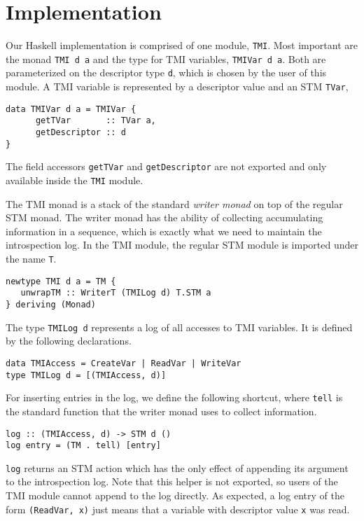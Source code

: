\section{Implementation}
\label{sec:implementation}

Our Haskell implementation is comprised of one module, \verb+TMI+. Most important are the
monad \lstinline+TMI d a+ and the type for TMI variables, \lstinline+TMIVar d a+. 
Both are parameterized on the descriptor type \lstinline+d+, which is chosen by the user
of this module. A TMI variable is represented by a descriptor value and an STM \lstinline+TVar+,
\begin{lstlisting}[style=small]
data TMIVar d a = TMIVar {
      getTVar       :: TVar a,
      getDescriptor :: d
}
\end{lstlisting}
The field accessors \lstinline+getTVar+ and \lstinline+getDescriptor+ are not exported and
only available inside the \lstinline+TMI+ module.

The TMI monad is a stack of the standard {\em writer monad} on top of the regular STM
monad. The writer monad has the ability of collecting accumulating information in a
sequence, which is exactly what we need to maintain the introspection log.
In the TMI module, the regular STM module is imported under the name \lstinline+T+.
\begin{lstlisting}[style=small]
newtype TMI d a = TM {
   unwrapTM :: WriterT (TMILog d) T.STM a
} deriving (Monad)
\end{lstlisting}
The type \lstinline+TMILog d+ represents a log of all accesses to TMI variables.
It is defined by the following declarations.
\begin{lstlisting}[style=small]
data TMIAccess = CreateVar | ReadVar | WriteVar
type TMILog d = [(TMIAccess, d)]
\end{lstlisting}
For inserting entries in the log, we define the following shortcut, where \lstinline+tell+
is the standard function that the writer monad uses to collect information.
\begin{lstlisting}[style=small]
log :: (TMIAccess, d) -> STM d ()
log entry = (TM . tell) [entry]
\end{lstlisting}
\lstinline+log+ returns an STM action which has the
only effect of appending its argument to the introspection log. Note that this
helper is not exported, so users of the TMI module cannot append to the log
directly.
As expected, a log entry of the form \lstinline+(ReadVar, x)+ just means that a variable with descriptor
value \lstinline+x+ was read. 

